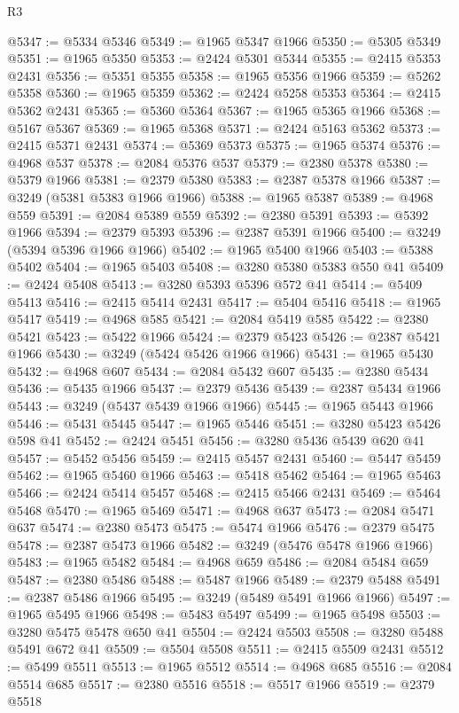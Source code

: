\begin{lexlean}{R3}
\begin{coremodule}
@5347 := @5334 @5346
@5349 := @1965 @5347 @1966
@5350 := @5305 @5349
@5351 := @1965 @5350
@5353 := @2424 @5301 @5344
@5355 := @2415 @5353 @2431
@5356 := @5351 @5355
@5358 := @1965 @5356 @1966
@5359 := @5262 @5358
@5360 := @1965 @5359
@5362 := @2424 @5258 @5353
@5364 := @2415 @5362 @2431
@5365 := @5360 @5364
@5367 := @1965 @5365 @1966
@5368 := @5167 @5367
@5369 := @1965 @5368
@5371 := @2424 @5163 @5362
@5373 := @2415 @5371 @2431
@5374 := @5369 @5373
@5375 := @1965 @5374
@5376 := @4968 @537
@5378 := @2084 @5376 @537
@5379 := @2380 @5378
@5380 := @5379 @1966
@5381 := @2379 @5380
@5383 := @2387 @5378 @1966
@5387 := @3249 (@5381 @5383 @1966 @1966)
@5388 := @1965 @5387
@5389 := @4968 @559
@5391 := @2084 @5389 @559
@5392 := @2380 @5391
@5393 := @5392 @1966
@5394 := @2379 @5393
@5396 := @2387 @5391 @1966
@5400 := @3249 (@5394 @5396 @1966 @1966)
@5402 := @1965 @5400 @1966
@5403 := @5388 @5402
@5404 := @1965 @5403
@5408 := @3280 @5380 @5383 @550 @41
@5409 := @2424 @5408
@5413 := @3280 @5393 @5396 @572 @41
@5414 := @5409 @5413
@5416 := @2415 @5414 @2431
@5417 := @5404 @5416
@5418 := @1965 @5417
@5419 := @4968 @585
@5421 := @2084 @5419 @585
@5422 := @2380 @5421
@5423 := @5422 @1966
@5424 := @2379 @5423
@5426 := @2387 @5421 @1966
@5430 := @3249 (@5424 @5426 @1966 @1966)
@5431 := @1965 @5430
@5432 := @4968 @607
@5434 := @2084 @5432 @607
@5435 := @2380 @5434
@5436 := @5435 @1966
@5437 := @2379 @5436
@5439 := @2387 @5434 @1966
@5443 := @3249 (@5437 @5439 @1966 @1966)
@5445 := @1965 @5443 @1966
@5446 := @5431 @5445
@5447 := @1965 @5446
@5451 := @3280 @5423 @5426 @598 @41
@5452 := @2424 @5451
@5456 := @3280 @5436 @5439 @620 @41
@5457 := @5452 @5456
@5459 := @2415 @5457 @2431
@5460 := @5447 @5459
@5462 := @1965 @5460 @1966
@5463 := @5418 @5462
@5464 := @1965 @5463
@5466 := @2424 @5414 @5457
@5468 := @2415 @5466 @2431
@5469 := @5464 @5468
@5470 := @1965 @5469
@5471 := @4968 @637
@5473 := @2084 @5471 @637
@5474 := @2380 @5473
@5475 := @5474 @1966
@5476 := @2379 @5475
@5478 := @2387 @5473 @1966
@5482 := @3249 (@5476 @5478 @1966 @1966)
@5483 := @1965 @5482
@5484 := @4968 @659
@5486 := @2084 @5484 @659
@5487 := @2380 @5486
@5488 := @5487 @1966
@5489 := @2379 @5488
@5491 := @2387 @5486 @1966
@5495 := @3249 (@5489 @5491 @1966 @1966)
@5497 := @1965 @5495 @1966
@5498 := @5483 @5497
@5499 := @1965 @5498
@5503 := @3280 @5475 @5478 @650 @41
@5504 := @2424 @5503
@5508 := @3280 @5488 @5491 @672 @41
@5509 := @5504 @5508
@5511 := @2415 @5509 @2431
@5512 := @5499 @5511
@5513 := @1965 @5512
@5514 := @4968 @685
@5516 := @2084 @5514 @685
@5517 := @2380 @5516
@5518 := @5517 @1966
@5519 := @2379 @5518

\end{coremodule}
\end{lexlean}
